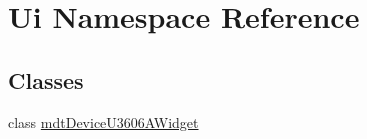 \hypertarget{namespace_ui}{\section{Ui Namespace Reference}
\label{namespace_ui}
}
\subsection*{Classes}
\begin{DoxyCompactItemize}
\item 
class \hyperlink{class_ui_1_1mdt_device_u3606_a_widget}{mdt\-Device\-U3606\-A\-Widget}
\end{DoxyCompactItemize}
